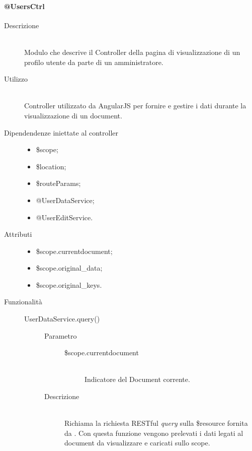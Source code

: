 \paragraph{@UsersCtrl}
\begin{description}
 \item[Descrizione] \hfill \\
 Modulo che descrive il Controller della pagina di visualizzazione di un profilo utente da parte di un amministratore.
 
 \item[Utilizzo] \hfill \\
 Controller utilizzato da AngularJS per fornire e gestire i dati durante la visualizzazione di un document.
 
 \item[Dipendendenze iniettate al controller] \hfill
 \begin{itemize}
  \item \$scope;
  \item \$location;
  \item \$routeParams;
  \item @UserDataService;
  \item @UserEditService.
  
 \end{itemize}
 
 \item[Attributi] \hfill
 \begin{itemize}
  \item \$scope.current\textunderscore document;
  \item \$scope.original\_data;
  \item \$scope.original\_keys.
 \end{itemize}
 
 \item[Funzionalità] \hfill
 \begin{description}
  \item[UserDataService.query()] \hfill
  \begin{description}
  	\item[Parametro] \hfill
  		\begin{description}
  			\item[\$scope.current\textunderscore document] \hfill \\
  			Indicatore del Document corrente.
       \end{description}
  	\item[Descrizione] \hfill \\  
  Richiama la richiesta RESTful \textit{query} sulla \$resource fornita da .
  Con questa funzione vengono prelevati i dati legati al document da visualizzare e caricati sullo scope.
 

\end{description}
\end{description}
\end{description}
